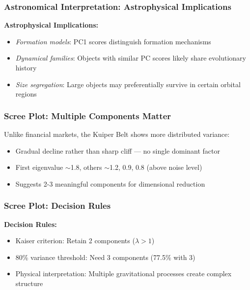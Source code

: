 \documentclass[aspectratio=169]{beamer}
\begin{document}
\begin{frame}
    \frametitle{Astronomical Interpretation: Astrophysical Implications}
    \textbf{Astrophysical Implications:}
    \begin{itemize}
        \item \textit{Formation models}: PC1 scores distinguish formation mechanisms \pause
        \item \textit{Dynamical families}: Objects with similar PC scores likely share evolutionary history \pause
        \item \textit{Size segregation}: Large objects may preferentially survive in certain orbital regions \pause
    \end{itemize}
\end{frame}

\begin{frame}
    \frametitle{Scree Plot: Multiple Components Matter}
    Unlike financial markets, the Kuiper Belt shows more distributed variance:
    \begin{itemize}
        \item Gradual decline rather than sharp cliff — no single dominant factor \pause
        \item First eigenvalue $\sim$1.8, others $\sim$1.2, 0.9, 0.8 (above noise level) \pause
        \item Suggests 2-3 meaningful components for dimensional reduction \pause
    \end{itemize}
\end{frame}

\begin{frame}
    \frametitle{Scree Plot: Decision Rules}
    \textbf{Decision Rules:}
    \begin{itemize}
        \item Kaiser criterion: Retain 2 components ($\lambda > 1$) \pause
        \item 80\% variance threshold: Need 3 components (77.5\% with 3) \pause
        \item Physical interpretation: Multiple gravitational processes create complex structure \pause
    \end{itemize}
\end{frame}
\end{document}
